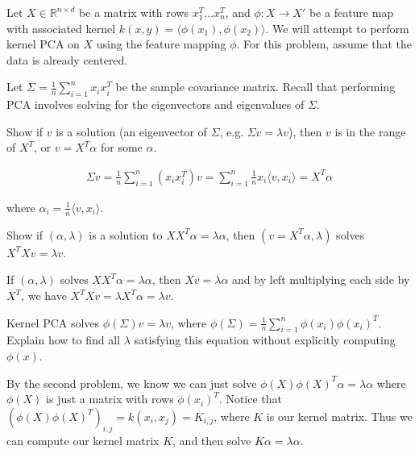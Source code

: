 \newcommand*{\inner}[2]{\langle #1,#2\rangle}


Let $X \in \mathbb{R}^{n \times d}$ be a matrix with rows $x_1^T \ldots x_n^T$, and $\phi: X \longrightarrow X'$ be a feature map with associated kernel $k(x, y) = \inner{\phi(x_1)} {\phi(x_2)}$. We will attempt to perform kernel PCA on $X$ using the feature mapping $\phi$. For this problem, assume that the data is already centered.

\begin{Parts}
\Part Let $\Sigma = \frac{1}{n} \sum_{i=1}^n x_i x_i^T$ be the sample covariance matrix. Recall that performing PCA involves solving for the eigenvectors and eigenvalues of $\Sigma$.

Show if $v$ is a solution (an eigenvector of $\Sigma$, e.g. $\Sigma v = \lambda v$), then $v$ is in the range of $X^T$, or $v = X^T \alpha$ for some $\alpha$.

\begin{solution}

\begin{align*}
\Sigma v = \frac{1}{n} \sum_{i=1}^n (x_i x_i^T) v=  \sum_{i=1}^n \frac{1}{n} x_i \inner{v}{x_i} = X^T \alpha
\end{align*}

where $\alpha_i = \frac{1}{n} \inner{v}{x_i}$.

\end{solution}

\Part Show if $(\alpha, \lambda)$ is a solution to $X X^T \alpha = \lambda \alpha$, then $(v=X^T \alpha, \lambda)$ solves $X^T X v = \lambda v$.

\begin{solution}

If $(\alpha, \lambda)$ solves $X X^T \alpha = \lambda \alpha$, then $Xv = \lambda \alpha$ and by left multiplying each side by $X^T$, we have $X^T X v = \lambda X^T \alpha = \lambda v$.

\end{solution}

\Part Kernel PCA solves $\phi(\Sigma) v = \lambda v$, where $\phi(\Sigma) = \frac{1}{n} \sum_{i=1}^n \phi(x_i) \phi(x_i)^T$. Explain how to find all $\lambda$ satisfying this equation without explicitly computing $\phi(x)$.

\begin{solution}

By the second problem, we know we can just solve $\phi(X) \phi(X)^T \alpha = \lambda \alpha$ where $\phi(X)$ is just a matrix with rows $\phi(x_i)^T$. Notice that $(\phi(X) \phi(X)^T)_{i,j} = k(x_i, x_j) = K_{i, j}$, where $K$ is our kernel matrix. Thus we can compute our kernel matrix $K$, and then solve $K \alpha = \lambda \alpha$.


\end{solution}
\end{Parts}
